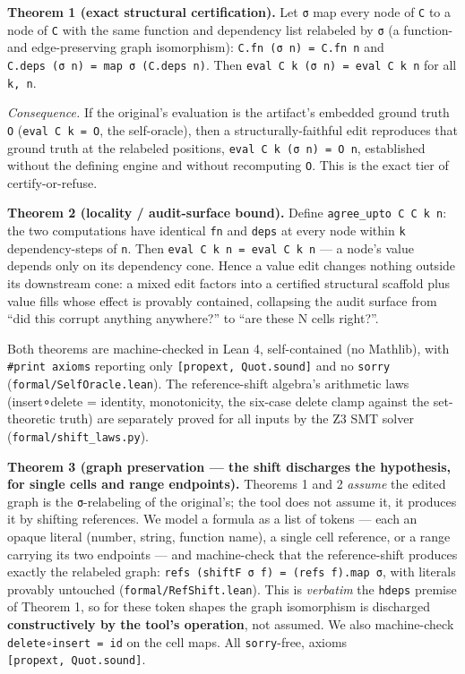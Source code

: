 \documentclass[
  11pt,
]{article}
\begin{document}
\textbf{Theorem 1 (exact structural certification).} Let \texttt{σ} map
every node of \texttt{C} to a node of \texttt{C\textquotesingle{}} with
the same function and dependency list relabeled by \texttt{σ} (a
function- and edge-preserving graph isomorphism):
\texttt{C\textquotesingle{}.fn\ (σ\ n)\ =\ C.fn\ n} and
\texttt{C\textquotesingle{}.deps\ (σ\ n)\ =\ map\ σ\ (C.deps\ n)}. Then
\texttt{eval\ C\textquotesingle{}\ k\ (σ\ n)\ =\ eval\ C\ k\ n} for all
\texttt{k,\ n}.

\emph{Consequence.} If the original's evaluation is the artifact's
embedded ground truth \texttt{O} (\texttt{eval\ C\ k\ =\ O}, the
self-oracle), then a structurally-faithful edit reproduces that ground
truth at the relabeled positions,
\texttt{eval\ C\textquotesingle{}\ k\ (σ\ n)\ =\ O\ n}, established
without the defining engine and without recomputing \texttt{O}. This is
the exact tier of certify-or-refuse.

\textbf{Theorem 2 (locality / audit-surface bound).} Define
\texttt{agree\_upto\ C\ C\textquotesingle{}\ k\ n}: the two computations
have identical \texttt{fn} and \texttt{deps} at every node within
\texttt{k} dependency-steps of \texttt{n}. Then
\texttt{eval\ C\ k\ n\ =\ eval\ C\textquotesingle{}\ k\ n} --- a node's
value depends only on its dependency cone. Hence a value edit changes
nothing outside its downstream cone: a mixed edit factors into a
certified structural scaffold plus value fills whose effect is provably
contained, collapsing the audit surface from ``did this corrupt anything
anywhere?'' to ``are these N cells right?''.

Both theorems are machine-checked in Lean 4, self-contained (no
Mathlib), with \texttt{\#print\ axioms} reporting only
\texttt{{[}propext,\ Quot.sound{]}} and no \texttt{sorry}
(\texttt{formal/SelfOracle.lean}). The reference-shift algebra's
arithmetic laws (insert∘delete = identity, monotonicity, the six-case
delete clamp against the set-theoretic truth) are separately proved for
all inputs by the Z3 SMT solver (\texttt{formal/shift\_laws.py}).

\textbf{Theorem 3 (graph preservation --- the shift discharges the
hypothesis, for single cells and range endpoints).} Theorems 1 and 2
\emph{assume} the edited graph is the \texttt{σ}-relabeling of the
original's; the tool does not assume it, it produces it by shifting
references. We model a formula as a list of tokens --- each an opaque
literal (number, string, function name), a single cell reference, or a
range carrying its two endpoints --- and machine-check that the
reference-shift produces exactly the relabeled graph:
\texttt{refs\ (shiftF\ σ\ f)\ =\ (refs\ f).map\ σ}, with literals
provably untouched (\texttt{formal/RefShift.lean}). This is
\emph{verbatim} the \texttt{hdeps} premise of Theorem 1, so for these
token shapes the graph isomorphism is discharged \textbf{constructively
by the tool's operation}, not assumed. We also machine-check
\texttt{delete∘insert\ =\ id} on the cell maps. All \texttt{sorry}-free,
axioms \texttt{{[}propext,\ Quot.sound{]}}.
\end{document}
